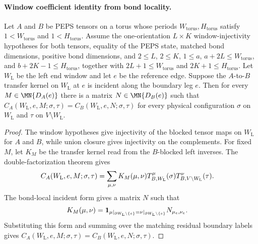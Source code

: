 \paragraph{Window coefficient identity from bond locality.}

\begin{lemma}
    \label{thm:peps_windowCoeffTransferAB_of_bondLocal}
    \leanok
    Let $A$ and $B$ be PEPS tensors on a torus whose periods
    $W_{\mathrm{torus}},H_{\mathrm{torus}}$ satisfy $1<W_{\mathrm{torus}}$
    and $1<H_{\mathrm{torus}}$. Assume the one-orientation $L\times K$
    window-injectivity hypotheses for both tensors, equality
    of the PEPS state, matched bond dimensions, positive bond dimensions, and
    $2\le L$, $2\le K$, $1\le a$, $a+2L\le W_{\mathrm{torus}}$, and
    $b+2K-1\le H_{\mathrm{torus}}$, together with
    $2L+1\le W_{\mathrm{torus}}$ and $2K+1\le H_{\mathrm{torus}}$.
    Let $W_{\mathrm L}$ be the left end window and let $e$ be the reference
    edge. Suppose the $A$-to-$B$ transfer kernel on $W_{\mathrm L}$ at $e$ is
    incident along the boundary leg $e$. Then for every
    $M\in\MN{D_A(e)}$ there is a matrix $N\in\MN{D_B(e)}$ such that
    $C_A(W_{\mathrm L},e,M;\sigma,\tau)
        =C_B(W_{\mathrm L},e,N;\sigma,\tau)$
    for every physical configuration $\sigma$ on $W_{\mathrm L}$ and $\tau$
    on $V\setminus W_{\mathrm L}$.
\end{lemma}
\begin{proof}
    \leanok
    The window hypotheses give injectivity of the blocked tensor maps on
    $W_{\mathrm L}$ for $A$ and $B$, while union closure gives injectivity on
    the complements. For fixed $M$, let $K_M$ be the transfer kernel read from
    the $B$-blocked left inverses. The double-factorization theorem gives
    \begin{align}
        C_A(W_{\mathrm L},e,M;\sigma,\tau)
         & =
        \sum_{\mu,\nu}
        K_M(\mu,\nu)
        T_{B,W_{\mathrm L}}^{\mu}(\sigma)
        T_{B,V\setminus W_{\mathrm L}}^{\nu}(\tau). \notag
    \end{align}
    The bond-local incident form gives a matrix $N$ such that
    \begin{align}
        K_M(\mu,\nu)
         & =
        \mathbf 1_{\mu|_{\partial W_{\mathrm L}\setminus\{e\}}
                =\nu|_{\partial W_{\mathrm L}\setminus\{e\}}}
        N_{\mu_e,\nu_e}. \notag
    \end{align}
    Substituting this form and summing over the matching residual boundary
    labels gives
    $C_A(W_{\mathrm L},e,M;\sigma,\tau)
        =C_B(W_{\mathrm L},e,N;\sigma,\tau)$.
\end{proof}

